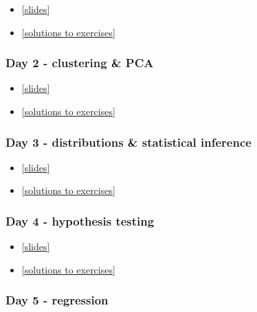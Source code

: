 \documentclass[
]{book}
\providecommand{\tightlist}{%
  \setlength{\itemsep}{0pt}\setlength{\parskip}{0pt}}
\begin{document}
\begin{itemize}
\tightlist
\item
  \href{./slides/GKBioinfo_week1_day1.pdf}{{[}slides{]}}
\item
  \href{./slides/solution_day1.Rmd}{{[}solutions to exercises{]}}
\end{itemize}

\hypertarget{day-2---clustering-pca}{%
\subsubsection{Day 2 - clustering \& PCA}\label{day-2---clustering-pca}}

\begin{itemize}
\tightlist
\item
  \href{./slides/GKBioinfo_week1_day2.pdf}{{[}slides{]}}
\item
  \href{./slides/solution_day2.Rmd}{{[}solutions to exercises{]}}
\end{itemize}

\hypertarget{day-3---distributions-statistical-inference}{%
\subsubsection{Day 3 - distributions \& statistical inference}\label{day-3---distributions-statistical-inference}}

\begin{itemize}
\tightlist
\item
  \href{./slides/GKBioinfo_week1_day3.pdf}{{[}slides{]}}
\item
  \href{./slides/solution_day3.Rmd}{{[}solutions to exercises{]}}
\end{itemize}

\hypertarget{day-4---hypothesis-testing}{%
\subsubsection{Day 4 - hypothesis testing}\label{day-4---hypothesis-testing}}

\begin{itemize}
\tightlist
\item
  \href{./slides/GKBioinfo_week1_day4.pdf}{{[}slides{]}}
\item
  \href{./slides/solution_day4.Rmd}{{[}solutions to exercises{]}}
\end{itemize}

\hypertarget{day-5---regression}{%
\subsubsection{Day 5 - regression}\label{day-5---regression}}
\end{document}
